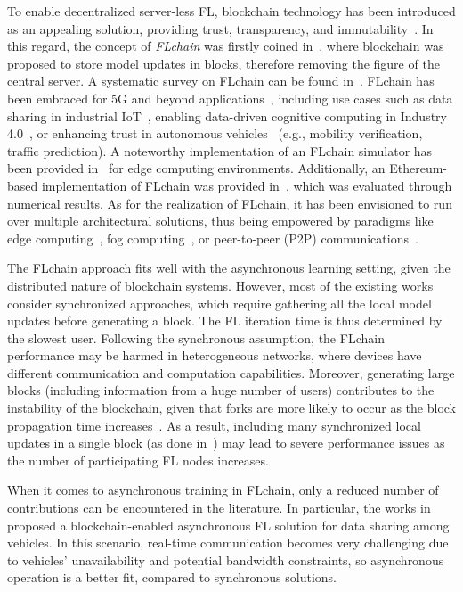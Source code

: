 \documentclass[lettersize,journal]{IEEEtran}
\begin{document}
To enable decentralized server-less FL, blockchain technology has been introduced as an appealing solution, providing trust, transparency, and immutability~\cite{liu2020secure, al2021edge}. In this regard, the concept of \textit{FLchain} was firstly coined in~\cite{majeed2019flchain, bao2019flchain}, where blockchain was proposed to store model updates in blocks, therefore removing the figure of the central server. A systematic survey on FLchain can be found in~\cite{hou2021systematic}. FLchain has been embraced for 5G and beyond applications~\cite{lu2020blockchain2}, including use cases such as data sharing in industrial IoT~\cite{lu2019blockchain}, enabling data-driven cognitive computing in Industry 4.0~\cite{qu2020blockchained}, or enhancing trust in autonomous vehicles~\cite{pokhrel2020federated,qi2021privacy} (e.g., mobility verification, traffic prediction). A noteworthy implementation of an FLchain simulator has been provided in~\cite{qu2021chainfl} for edge computing environments. Additionally, an Ethereum-based implementation of FLchain was provided in~\cite{korkmaz2020chain}, which was evaluated through numerical results. As for the realization of FLchain, it has been envisioned to run over multiple architectural solutions, thus being empowered by paradigms like edge computing~\cite{majeed2019flchain}, fog computing~\cite{qu2020decentralized}, or peer-to-peer (P2P) communications~\cite{kim2019blockchained, ma2020federated}. 

The FLchain approach fits well with the asynchronous learning setting, given the distributed nature of blockchain systems. However, most of the existing works consider synchronized approaches, which require gathering all the local model updates before generating a block. The FL iteration time is thus determined by the slowest user. Following the synchronous assumption, the FLchain performance may be harmed in heterogeneous networks, where devices have different communication and computation capabilities. Moreover, generating large blocks (including information from a huge number of users) contributes to the instability of the blockchain, given that forks are more likely to occur as the block propagation time increases~\cite{wilhelmi2021performance}. As a result, including many synchronized local updates in a single block (as done in~\cite{kim2019blockchained,liu2021blockchain}) may lead to severe performance issues as the number of participating FL nodes increases.

When it comes to asynchronous training in FLchain, only a reduced number of contributions can be encountered in the literature. In particular, the works in~\cite{lu2020blockchain, lu2020blockchain2} proposed a blockchain-enabled asynchronous FL solution for data sharing among vehicles. In this scenario, real-time communication becomes very challenging due to vehicles' unavailability and potential bandwidth constraints, so asynchronous operation is a better fit, compared to synchronous solutions.
\end{document}
